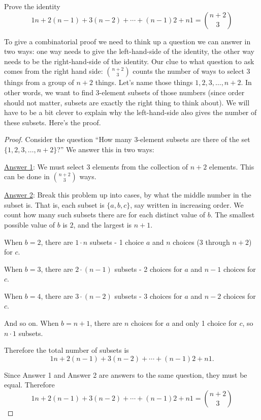 \documentclass[12pt]{article}
\begin{document}
\begin{example}
  Prove the identity
  \[1 n + 2(n-1) + 3  (n-2) + \cdots + (n-1) 2 + n  1 = {n+2 \choose 3}\]
  \begin{solution}
    To give a combinatorial proof we need to think up a question we can answer in two ways: one way needs to give the left-hand-side of the identity, the other way needs to be the right-hand-side of the identity.  Our clue to what question to ask comes from the right hand side: ${n+2 \choose 3}$ counts the number of ways to select 3 things from a group of $n+2$ things.  Let's name those things $1, 2, 3, \ldots, n+2$.  In other words, we want to find 3-element subsets of those numbers (since order should not matter, subsets are exactly the right thing to think about).  We will have to be a bit clever to explain why the left-hand-side also gives the number of these subsets.  Here's the proof.
    
    \begin{proof}
      Consider the question ``How many 3-element subsets are there of the set $\{1,2,3,\ldots, n+2\}$?''  We answer this in two ways:
      
      \underline{Answer 1}: We must select 3 elements from the collection of $n+2$ elements.  This can be done in ${n+2 \choose 3}$ ways.
      
      \underline{Answer 2}: Break this problem up into cases, by what the middle number in the subset is.  That is, each subset is $\{a,b,c\}$, say written in increasing order.  We count how many such subsets there are for each distinct value of $b$.  The smallest possible value of $b$ is $2$, and the largest is $n+1$.  
      
      When $b = 2$, there are $1 \cdot n$ subsets - 1 choice $a$ and $n$ choices (3 through $n+2$) for $c$.
      
      When $b = 3$, there are $2 \cdot (n-1)$ subsets - 2 choices for $a$ and $n-1$ choices for $c$.
      
      When $b = 4$, there are $3 \cdot (n-2)$ subsets - 3 choices for $a$ and $n-2$ choices for $c$.
      
      And so on.  When $b = n+1$, there are $n$ choices for $a$ and only 1 choice for $c$, so $n \cdot 1$ subsets.
      
      Therefore the total number of subsets is \[1 n + 2 (n-1) + 3  (n-2) + \cdots + (n-1)2 + n  1.\]
      
      Since Answer 1 and Answer 2 are answers to the same question, they must be equal.  Therefore
      \[1 n + 2 (n-1) + 3  (n-2) + \cdots + (n-1) 2 + n  1 = {n+2 \choose 3}\]
      
    \end{proof}

  \end{solution}

\end{example}
\end{document}
